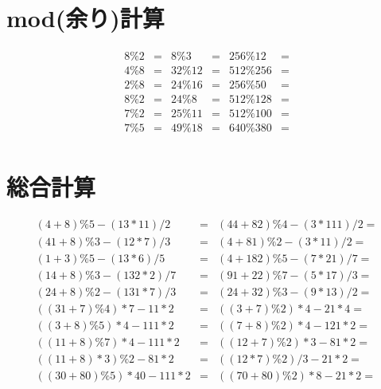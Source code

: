 \documentclass[paper=b4j,landscape,twocolumn,fleqn]{jlreq}
\begin{document}
\section{mod(余り)計算}
\begin{align*}
  8\%2&=  & 8\%3&=   & 256\%12&=\\
  4\%8&= & 32\%12&= & 512\%256&=\\
  2\%8&= & 24\%16&= & 256\%50&=\\
  8\%2&= & 24\%8&=  & 512\%128&=\\
  7\%2&= & 25\%11&= & 512\%100&=\\
  7\%5&= & 49\%18&= & 640\%380&=\\
\end{align*}
\section{総合計算}
\begin{align*}
  (4+8)\%5-(13*11)/2 &= & (44+82)\%4-(3*111)/2 =\\
  (41+8)\%3-(12*7)/3 &= & (4+81)\%2-(3*11)/2 =\\
  (1+3)\%5-(13*6)/5 &= & (4+182)\%5-(7*21)/7 =\\
  (14+8)\%3-(132*2)/7 &= & (91+22)\%7-(5*17)/3 =\\
  (24+8)\%2-(131*7)/3 &= & (24+32)\%3-(9*13)/2 =\\
  ((31+7)\%4)*7-11*2 &= & ((3+7)\%2)*4-21*4   =\\
  ((3+8)\%5)*4-111*2 &= & ((7+8)\%2)*4-121*2   =\\
  ((11+8)\%7)*4-111*2 &= & ((12+7)\%2)*3-81*2   =\\
  ((11+8)*3)\%2-81*2 &= & ((12*7)\%2)/3-21*2   =\\
  ((30+80)\%5)*40-111*2 &= & ((70+80)\%2)*8-21*2   =\\
\end{align*}
\end{document}
